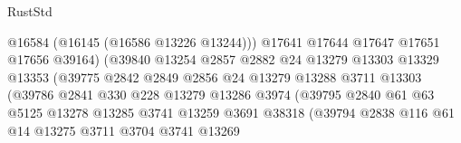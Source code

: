 \begin{lexlean}{RustStd}
\begin{coremodule}
                                        @16584
                                        (@16145 (@16586 @13226 @13244)))
                                      @17641
                                      @17644
                                      @17647
                                      @17651
                                      @17656
                                      @39164)
                                    (@39840
                                      @13254
                                      @2857
                                      @2882
                                      @24
                                      @13279
                                      @13303
                                      @13329
                                      @13353
                                      (@39775
                                        @2842
                                        @2849
                                        @2856
                                        @24
                                        @13279
                                        @13288
                                        @3711
                                        @13303
                                        (@39786
                                          @2841
                                          @330
                                          @228
                                          @13279
                                          @13286
                                          @3974
                                          (@39795
                                            @2840
                                            @61
                                            @63
                                            @5125
                                            @13278
                                            @13285
                                            @3741
                                            @13259
                                            @3691
                                            @38318
                                            (@39794
                                              @2838
                                              @116
                                              @61
                                              @14
                                              @13275
                                              @3711
                                              @3704
                                              @3741
                                              @13269

\end{coremodule}
\end{lexlean}
